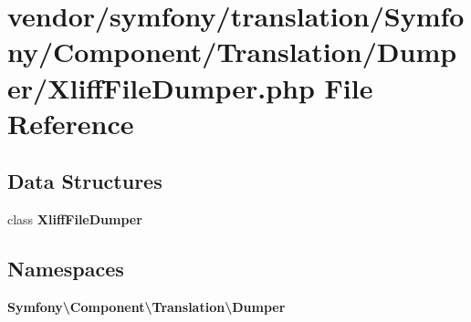\section{vendor/symfony/translation/\+Symfony/\+Component/\+Translation/\+Dumper/\+Xliff\+File\+Dumper.php File Reference}
\label{_xliff_file_dumper_8php}
\subsection*{Data Structures}
\begin{DoxyCompactItemize}
\item 
class {\bf Xliff\+File\+Dumper}
\end{DoxyCompactItemize}
\subsection*{Namespaces}
\begin{DoxyCompactItemize}
\item 
 {\bf Symfony\textbackslash{}\+Component\textbackslash{}\+Translation\textbackslash{}\+Dumper}
\end{DoxyCompactItemize}
